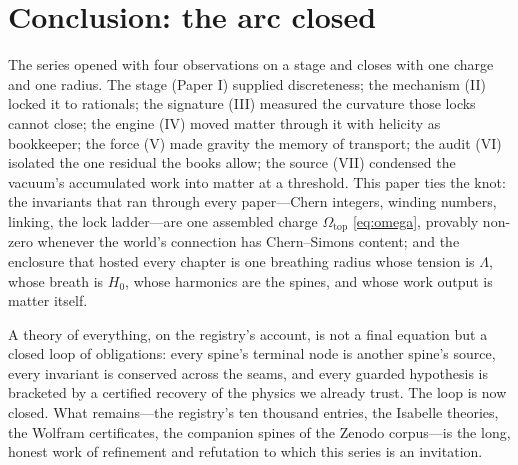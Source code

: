 \documentclass[11pt]{article}
\theoremstyle{remark}
\begin{document}
\section{Conclusion: the arc closed}
\label{sec:conclusion}

The series opened with four observations on a stage and closes with one charge and one radius. The stage (Paper I) supplied discreteness; the mechanism (II) locked it to rationals; the signature (III) measured the curvature those locks cannot close; the engine (IV) moved matter through it with helicity as bookkeeper; the force (V) made gravity the memory of transport; the audit (VI) isolated the one residual the books allow; the source (VII) condensed the vacuum's accumulated work into matter at a threshold. This paper ties the knot: the invariants that ran through every paper---Chern integers, winding numbers, linking, the lock ladder---are one assembled charge $\Omega_{\mathrm{top}}$ \eqref{eq:omega}, provably non-zero whenever the world's connection has Chern--Simons content; and the enclosure that hosted every chapter is one breathing radius whose tension is $\Lambda$, whose breath is $H_0$, whose harmonics are the spines, and whose work output is matter itself.

A theory of everything, on the registry's account, is not a final equation but a closed loop of obligations: every spine's terminal node is another spine's source, every invariant is conserved across the seams, and every guarded hypothesis is bracketed by a certified recovery of the physics we already trust. The loop is now closed. What remains---the registry's ten thousand entries, the Isabelle theories, the Wolfram certificates, the companion spines of the Zenodo corpus---is the long, honest work of refinement and refutation to which this series is an invitation.
\end{document}
